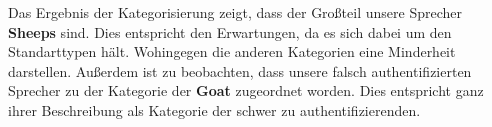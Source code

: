 \begin{table}[h]
\label{table:resultsZoo}
\end{table}


Das Ergebnis der Kategorisierung zeigt, dass der Großteil unsere Sprecher \textbf{Sheeps} sind. Dies entspricht den Erwartungen, da es sich dabei um den Standarttypen hält. Wohingegen die anderen Kategorien eine Minderheit darstellen. Außerdem ist zu beobachten, dass unsere falsch authentifizierten Sprecher zu der Kategorie der \textbf{Goat} zugeordnet worden. Dies entspricht ganz ihrer Beschreibung als Kategorie der schwer zu authentifizierenden.





